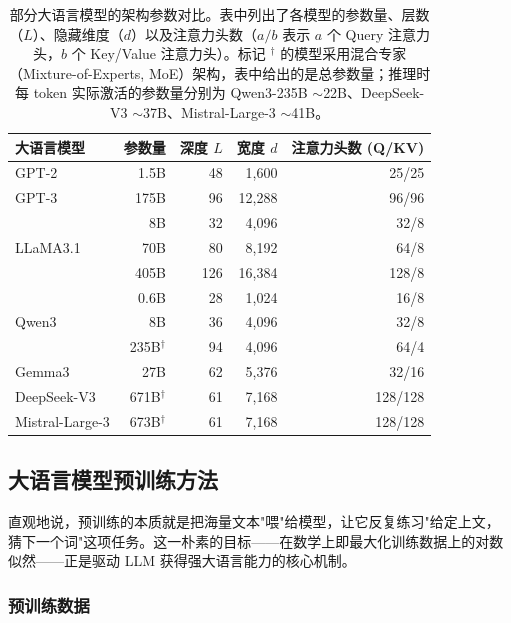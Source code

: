 \begin{table}[t]
  \centering
  \begingroup
  \renewcommand{\arraystretch}{1.2}
  \begin{tabular}{l | r | r | r | r}
  大语言模型 & 参数量 & 深度 $L$ & 宽度 $d$ & 注意力头数 (Q/KV) \\ \hline
  GPT-2 \cite{radford-etal:2019language} & 1.5B & 48 & 1,600 & 25/25 \\
  GPT-3 \cite{brown-etal:2020language} & 175B & 96 & 12,288 & 96/96 \\ \hline
  \multirow{3}{*}{LLaMA3.1 \cite{dubey2024llama}}
   & 8B & 32 & 4,096 & 32/8 \\
   & 70B & 80 & 8,192 & 64/8 \\
   & 405B & 126 & 16,384 & 128/8 \\ \hline
  \multirow{3}{*}{Qwen3 \cite{yang2025qwen3}}
   & 0.6B & 28 & 1,024 & 16/8 \\
   & 8B & 36 & 4,096 & 32/8 \\
   & 235B$^\dagger$ & 94 & 4,096 & 64/4 \\ \hline
  Gemma3 \cite{gemmateam2025gemma3} & 27B & 62 & 5,376 & 32/16 \\ \hline
  DeepSeek-V3 \cite{liu2024deepseek} & 671B$^\dagger$ & 61 & 7,168 & 128/128 \\
  Mistral-Large-3 \cite{mistral2025mistral3} & 673B$^\dagger$ & 61 & 7,168 & 128/128
  \end{tabular}
  \endgroup
  \caption{部分大语言模型的架构参数对比。表中列出了各模型的参数量、层数（$L$）、隐藏维度（$d$）以及注意力头数（$a/b$ 表示 $a$ 个 Query 注意力头，$b$ 个 Key/Value 注意力头）。标记 $^\dagger$ 的模型采用混合专家（Mixture-of-Experts, MoE）架构，表中给出的是总参数量；推理时每 token 实际激活的参数量分别为 Qwen3-235B $\sim$22B、DeepSeek-V3 $\sim$37B、Mistral-Large-3 $\sim$41B。}
  \label{tab:llm-model-size-comparison}
\end{table}

\subsection{大语言模型预训练方法}

直观地说，预训练的本质就是把海量文本"喂"给模型，让它反复练习"给定上文，猜下一个词"这项任务。这一朴素的目标——在数学上即最大化训练数据上的对数似然——正是驱动 LLM 获得强大语言能力的核心机制。

\subsubsection{预训练数据}

